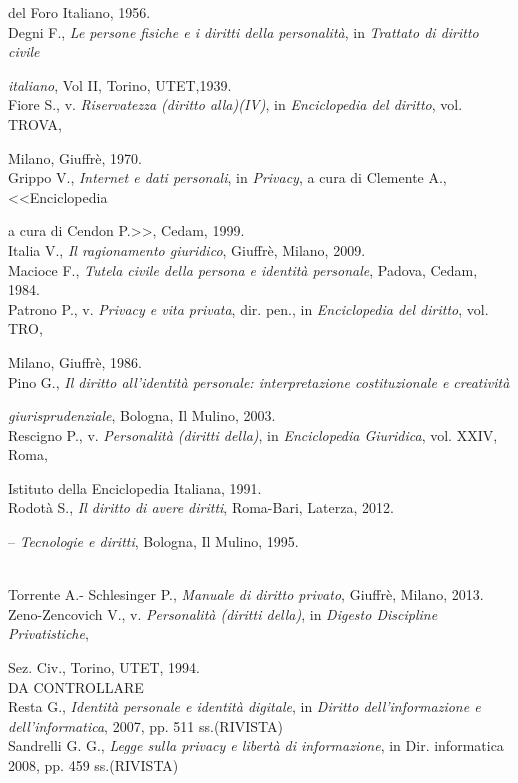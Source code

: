 del Foro Italiano, 1956.
\\Degni F., \textit{Le persone fisiche e i diritti della personalità}, in \textit{Trattato di diritto civile}

\textit{italiano}, Vol II, Torino, UTET,1939.
\\Fiore S., v. \textit{Riservatezza (diritto alla)(IV)}, in \textit{Enciclopedia del diritto}, vol. TROVA,

Milano, Giuffrè, 1970. 
\\Grippo V., \textit{Internet e dati personali}, in \textit{Privacy}, a cura di Clemente A., <<Enciclopedia

a cura di Cendon P.>>, Cedam, 1999.
\\Italia V., \textit{Il ragionamento giuridico}, Giuffrè, Milano, 2009.
\\Macioce F., \textit{Tutela civile della persona e identità personale}, Padova, Cedam, 1984.
\\Patrono P., v. \textit{Privacy e vita privata}, dir. pen., in \textit{Enciclopedia del diritto}, vol. TRO,

Milano, Giuffrè, 1986.
\\Pino G., \textit{Il diritto all'identità personale: interpretazione costituzionale e creatività} 

\textit{giurisprudenziale}, Bologna, Il Mulino, 2003.
\\Rescigno P., v. \textit{Personalità (diritti della)}, in \textit{Enciclopedia Giuridica}, vol. XXIV, Roma,

Istituto della Enciclopedia Italiana, 1991.
\\Rodotà S., \textit{Il diritto di avere diritti}, Roma-Bari, Laterza, 2012. 

-- \textit{Tecnologie e diritti}, Bologna, Il Mulino, 1995.

\\Torrente A.- Schlesinger P., \textit{Manuale di diritto privato}, Giuffrè, Milano, 2013.  
\\Zeno-Zencovich V., v. \textit{Personalità (diritti della)}, in \textit{Digesto Discipline Privatistiche},

Sez. Civ., Torino, UTET, 1994.
\\DA CONTROLLARE
\\Resta G., \textit{Identità personale e identità digitale}, in \textit{Diritto dell'informazione e dell'informatica}, 2007, pp. 511 ss.(RIVISTA)
\\Sandrelli G. G., \textit{Legge sulla privacy e libertà di informazione}, in Dir. informatica 2008, pp. 459 ss.(RIVISTA)
